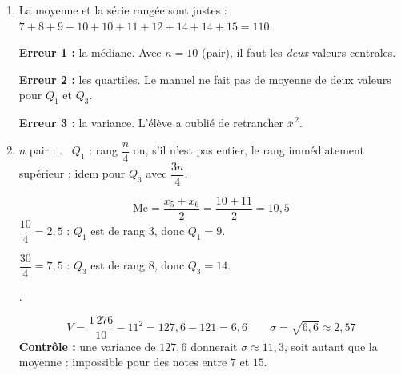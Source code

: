 \begin{enumerate}[itemsep=14pt]
  \item La moyenne et la série rangée sont justes : $7+8+9+10+10+11+12+14+14+15=110$.

  \textbf{Erreur 1 :} la médiane. Avec $n=10$ (pair), il faut les \emph{deux} valeurs centrales.

  \textbf{Erreur 2 :} les quartiles. Le manuel ne fait pas de moyenne de deux valeurs pour $Q_1$ et $Q_3$.

  \textbf{Erreur 3 :} la variance. L'élève a oublié de retrancher $\overline x^{\,2}$.

  \item
  \begin{prop}
  $n$ pair : . \ $Q_1$ : rang $\dfrac n4$ ou, s'il n'est pas entier, le rang immédiatement supérieur ; idem pour $Q_3$ avec $\dfrac{3n}4$.
  \end{prop}
  \[\text{Me}=\dfrac{x_5+x_6}{2}=\dfrac{10+11}{2}=10{,}5\]
  $\dfrac{10}{4}=2{,}5$ : $Q_1$ est de rang $3$, donc $Q_1=9$.

  $\dfrac{30}{4}=7{,}5$ : $Q_3$ est de rang $8$, donc $Q_3=14$.
  \begin{prop}[Variance]
  .
  \end{prop}
  \[V=\dfrac{1\,276}{10}-11^2=127{,}6-121=6{,}6\qquad\sigma=\sqrt{6{,}6}\approx2{,}57\]
  \textbf{Contrôle :} une variance de $127{,}6$ donnerait $\sigma\approx11{,}3$, soit autant que la moyenne : impossible pour des notes entre $7$ et $15$.
\end{enumerate}
